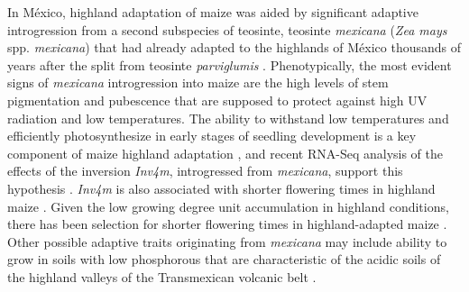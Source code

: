 \documentclass[9pt,twocolumn,twoside,lineno]{BioRxiv}
\begin{document}
In México, highland adaptation of maize was aided by significant adaptive introgression from a second subspecies of teosinte, teosinte \textit{mexicana} (\textit{Zea mays} spp. \textit{mexicana}) that had already adapted to the highlands of México thousands of years after the split from teosinte \textit{parviglumis} \cite{Hufford2013-gs, Gonzalez-Segovia2019-jy}. 
Phenotypically, the most evident signs of \textit{mexicana} introgression into maize are the high levels of stem pigmentation and pubescence \cite{Lauter2004-eq} that are supposed to protect against high UV radiation and low temperatures. 
The ability to withstand low temperatures and efficiently photosynthesize in early stages of seedling development is a key component of maize highland adaptation \cite{Hardacre1980-tq}, and recent RNA-Seq analysis of the effects of the inversion \textit{Inv4m}, introgressed from \textit{mexicana}, support this hypothesis \cite{Crow2020-gene}.
\textit{Inv4m} is also associated with shorter flowering times in highland maize \cite{Romero_Navarro2017-cn, Gates2019-xu}. 
Given the low growing degree unit accumulation in highland conditions, there has been selection for shorter flowering times in highland-adapted maize \cite{Gates2019-xu}. %
Other possible adaptive traits originating from \textit{mexicana} may include ability to grow in soils with low phosphorous \cite{AguirreLiguori2019-fl, Fustier2017-sl} that are characteristic of the acidic soils of the highland valleys of the Transmexican volcanic belt \cite{Krasilnikov2013-sm}.
\end{document}
